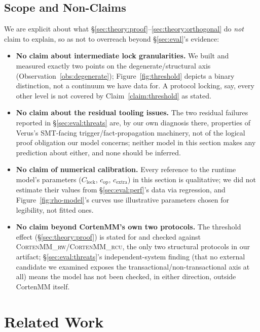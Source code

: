 \documentclass[10pt]{article}
\newcommand{\corten}[1]{\textsc{CortenMM\_#1}}
\begin{document}
\subsection{Scope and Non-Claims}
\label{sec:theory:scope}

We are explicit about what \S\ref{sec:theory:proof}--\ref{sec:theory:orthogonal}
do \emph{not} claim to explain, so as not to overreach beyond
\S\ref{sec:eval}'s evidence:

\begin{itemize}
  \item \textbf{No claim about intermediate lock granularities.} We
    built and measured exactly two points on the degenerate/structural
    axis (Observation~\ref{obs:degenerate}); Figure~\ref{fig:threshold}
    depicts a binary distinction, not a continuum we have data for. A
    protocol locking, say, every other level is not covered by
    Claim~\ref{claim:threshold} as stated.
  \item \textbf{No claim about the residual tooling issues.} The two
    residual failures reported in
    \S\ref{sec:eval:threats} are, by our own diagnosis there, properties
    of Verus's SMT-facing trigger/fact-propagation machinery, not of
    the logical proof obligation our model concerns; neither model in
    this section makes any prediction about either, and none should be
    inferred.
  \item \textbf{No claim of numerical calibration.} Every reference to
    the runtime model's parameters ($C_{\mathrm{lock}}$,
    $c_{\mathrm{op}}$, $c_{\mathrm{extra}}$) in this section is
    qualitative; we did not estimate their values from
    \S\ref{sec:eval:perf}'s data via regression, and
    Figure~\ref{fig:rho-model}'s curves use illustrative parameters
    chosen for legibility, not fitted ones.
  \item \textbf{No claim beyond CortenMM's own two protocols.} The
    threshold effect (\S\ref{sec:theory:proof}) is stated for and
    checked against \corten{rw}/\corten{rcu}, the only two structural
    protocols in our artifact; \S\ref{sec:eval:threats}'s independent-system
    finding (that no external candidate we examined exposes the
    transactional/non-transactional axis at all) means the model has
    not been checked, in either direction, outside CortenMM itself.
\end{itemize}



\section{Related Work}
\label{sec:related}
\end{document}
